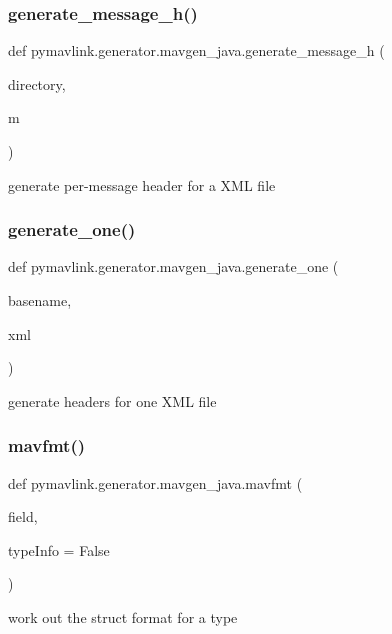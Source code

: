 \subsubsection{\texorpdfstring{generate\+\_\+message\+\_\+h()}{generate\_message\_h()}}
{\footnotesize\ttfamily def pymavlink.\+generator.\+mavgen\+\_\+java.\+generate\+\_\+message\+\_\+h (\begin{DoxyParamCaption}\item[{}]{directory,  }\item[{}]{m }\end{DoxyParamCaption})}

\begin{DoxyVerb}generate per-message header for a XML file\end{DoxyVerb}
 \mbox{\label{namespacepymavlink_1_1generator_1_1mavgen__java_a73c50060fdb0745de2d34d37c3b5c22c}} 
\subsubsection{\texorpdfstring{generate\+\_\+one()}{generate\_one()}}
{\footnotesize\ttfamily def pymavlink.\+generator.\+mavgen\+\_\+java.\+generate\+\_\+one (\begin{DoxyParamCaption}\item[{}]{basename,  }\item[{}]{xml }\end{DoxyParamCaption})}

\begin{DoxyVerb}generate headers for one XML file\end{DoxyVerb}
 \mbox{\label{namespacepymavlink_1_1generator_1_1mavgen__java_a23f35fe059a4de4d3ebbd2e148f86931}} 
\subsubsection{\texorpdfstring{mavfmt()}{mavfmt()}}
{\footnotesize\ttfamily def pymavlink.\+generator.\+mavgen\+\_\+java.\+mavfmt (\begin{DoxyParamCaption}\item[{}]{field,  }\item[{}]{type\+Info = {\ttfamily False} }\end{DoxyParamCaption})}

\begin{DoxyVerb}work out the struct format for a type\end{DoxyVerb}
 